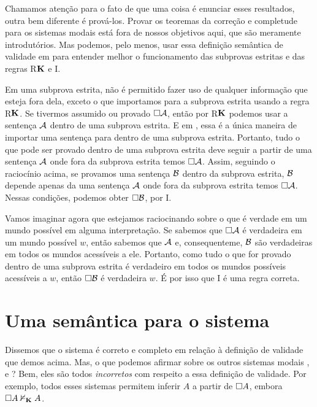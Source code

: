 Chamamos atenção para o fato de que uma coisa é enunciar esses resultados, outra bem diferente é prová-los. Provar os teoremas da correção e completude para os sistemas modais está fora de nossos objetivos aqui, que são meramente introdutórios. Mas podemos, pelo menos, usar essa definição semântica de validade em  \mlK{} para entender melhor o funcionamento das subprovas estritas e das regras R$\mathbf{K}$ e  \ebox I.

Em uma subprova estrita, não  é permitido fazer uso de qualquer informação que esteja fora dela, exceto o que importamos para a subprova estrita usando a regra  R$\mathbf{K}$. Se tivermos assumido ou provado $\Box \mathcal{A}$, então por  R$\mathbf{K}$ podemos usar a sentença  $\mathcal{A}$ dentro de uma subprova estrita. E em \mlK, essa é a única maneira de importar uma sentença para dentro de uma subprova estrita.
 Portanto, tudo o que pode ser provado dentro de uma subprova estrita deve seguir a partir de uma  sentença  $\mathcal{A}$ onde fora da subprova estrita temos $\Box \mathcal{A}$.
 Assim, seguindo o raciocínio acima, se provamos uma sentença $\mathcal{B}$ dentro da subprova estrita, $\mathcal{B}$ depende apenas da  uma sentença $\mathcal{A}$ onde fora da subprova estrita temos $\Box\mathcal{A}$.  Nessas condições, podemos obter  $\Box\mathcal{B}$,  por \ebox I.
 
  Vamos imaginar agora que estejamos raciocinando sobre o que é verdade em um mundo possível em alguma interpretação. Se sabemos que $\Box\mathcal{A}$ é verdadeira em um mundo possível $w$, então sabemos que $\mathcal{A}$ e, consequenteme, $\mathcal{B}$  são verdadeiras em todos os mundos acessíveis a ele.
  Portanto, como tudo o que for provado dentro de uma subprova estrita é verdadeiro em todos os mundos possíveis acessíveis a $w$, então $\Box\mathcal{B}$ é verdadeira $w$. É por isso que \ebox I é uma regra correta.


\section{Uma semântica para o sistema \mlT}
\label{SemanticsT}

Dissemos que o sistema \mlK{} é correto e completo em relação à definição de validade que demos acima. Mas,  o que podemos afirmar sobre os outros sistemas modais \mlT, \mlSfour{}  e \mlSfive  ? Bem, eles são todos  \emph{incorretos} com respeito a essa definição de validade. Por exemplo, todos esses sistemas permitem inferir $A$ a partir de $\Box A$, embora  $\Box A\nvDash_{\mathbf{K}} A$.

